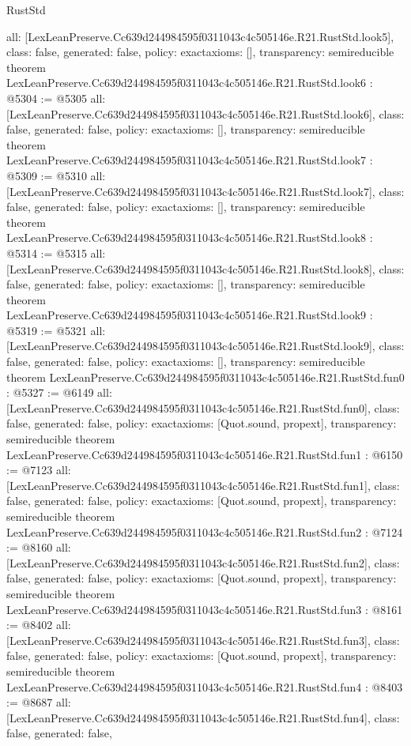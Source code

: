 \begin{lexlean}{RustStd}
\begin{coremodule}
{  all: [LexLeanPreserve.Cc639d244984595f0311043c4c505146e.R21.RustStd.look5],
  class: false,
  generated: false,
  policy: exact{axioms: []},
  transparency: semireducible
}
theorem LexLeanPreserve.Cc639d244984595f0311043c4c505146e.R21.RustStd.look6 : @5304 := @5305 {
  all: [LexLeanPreserve.Cc639d244984595f0311043c4c505146e.R21.RustStd.look6],
  class: false,
  generated: false,
  policy: exact{axioms: []},
  transparency: semireducible
}
theorem LexLeanPreserve.Cc639d244984595f0311043c4c505146e.R21.RustStd.look7 : @5309 := @5310 {
  all: [LexLeanPreserve.Cc639d244984595f0311043c4c505146e.R21.RustStd.look7],
  class: false,
  generated: false,
  policy: exact{axioms: []},
  transparency: semireducible
}
theorem LexLeanPreserve.Cc639d244984595f0311043c4c505146e.R21.RustStd.look8 : @5314 := @5315 {
  all: [LexLeanPreserve.Cc639d244984595f0311043c4c505146e.R21.RustStd.look8],
  class: false,
  generated: false,
  policy: exact{axioms: []},
  transparency: semireducible
}
theorem LexLeanPreserve.Cc639d244984595f0311043c4c505146e.R21.RustStd.look9 : @5319 := @5321 {
  all: [LexLeanPreserve.Cc639d244984595f0311043c4c505146e.R21.RustStd.look9],
  class: false,
  generated: false,
  policy: exact{axioms: []},
  transparency: semireducible
}
theorem LexLeanPreserve.Cc639d244984595f0311043c4c505146e.R21.RustStd.fun0 : @5327 := @6149 {
  all: [LexLeanPreserve.Cc639d244984595f0311043c4c505146e.R21.RustStd.fun0],
  class: false,
  generated: false,
  policy: exact{axioms: [Quot.sound, propext]},
  transparency: semireducible
}
theorem LexLeanPreserve.Cc639d244984595f0311043c4c505146e.R21.RustStd.fun1 : @6150 := @7123 {
  all: [LexLeanPreserve.Cc639d244984595f0311043c4c505146e.R21.RustStd.fun1],
  class: false,
  generated: false,
  policy: exact{axioms: [Quot.sound, propext]},
  transparency: semireducible
}
theorem LexLeanPreserve.Cc639d244984595f0311043c4c505146e.R21.RustStd.fun2 : @7124 := @8160 {
  all: [LexLeanPreserve.Cc639d244984595f0311043c4c505146e.R21.RustStd.fun2],
  class: false,
  generated: false,
  policy: exact{axioms: [Quot.sound, propext]},
  transparency: semireducible
}
theorem LexLeanPreserve.Cc639d244984595f0311043c4c505146e.R21.RustStd.fun3 : @8161 := @8402 {
  all: [LexLeanPreserve.Cc639d244984595f0311043c4c505146e.R21.RustStd.fun3],
  class: false,
  generated: false,
  policy: exact{axioms: [Quot.sound, propext]},
  transparency: semireducible
}
theorem LexLeanPreserve.Cc639d244984595f0311043c4c505146e.R21.RustStd.fun4 : @8403 := @8687 {
  all: [LexLeanPreserve.Cc639d244984595f0311043c4c505146e.R21.RustStd.fun4],
  class: false,
  generated: false,
}
\end{coremodule}
\end{lexlean}
